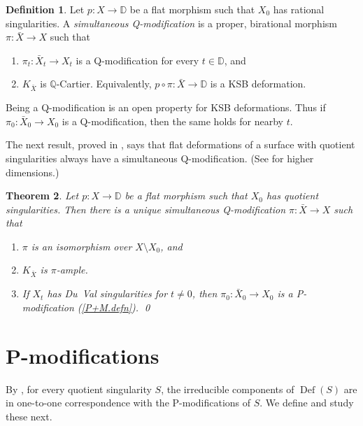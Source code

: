 \documentclass{amsart}
\newtheorem{thm}{Theorem}%
\theoremstyle{definition}
\newtheorem{defn}[thm]{Definition}
\theoremstyle{remark}
\newcommand{\dd}[0]{{\mathbb D}}
\newcommand{\q}[0]{{\mathbb Q}}
\newcommand{\defsp}[0]{\operatorname{Def}}
\begin{document}
\medskip






\begin{defn} \label{sim.Q.mod.defn} Let $p:X\to \dd$ be a flat morphism such that $X_0$ has rational singularities. A {\it simultaneous Q-modification} is a
  proper, birational morphism  $\pi:\bar X\to X$ such that
\begin{enumerate}
       \item $\pi_t:\bar X_t\to X_t$ is a Q-modification for every $t\in \dd$, and
    \item $K_{\bar X}$ is $\q$-Cartier. Equivalently,     $p\circ \pi:\bar X\to \dd$ is a KSB deformation.
\end{enumerate}
Being a Q-modification is an open property for KSB deformations.
Thus if  $\pi_0:\bar X_0\to X_0$ is a Q-modification, then the same holds for nearby $t$.
\end{defn}


The next result, proved in \cite[3.5]{ksb},  says that flat deformations of a surface  with quotient singularities always have a simultaneous Q-modification.
(See  \cite[5.41]{k-modbook} for higher dimensions.)

\begin{thm}\label{cmod.ksb.thm}
Let $p:X\to \dd$ be a flat morphism such that $X_0$ has quotient singularities. Then there is a unique  simultaneous Q-modification $\pi:\bar X\to X$ such that
  \begin{enumerate}
  \item $\pi$ is an isomorphism over $X\setminus X_0$, and 
        \item $K_{\bar X}$ is  $\pi$-ample.
    \item If $X_t$ has Du~Val singularities for $t\neq 0$, then
 $\pi_0:\bar X_0\to X_0$ is a P-modification  (\ref{P+M.defn}).
      \qed
  \end{enumerate}
\end{thm}






\section{P-modifications}

By \cite[3.9]{ksb}, for every quotient singularity $S$, the irreducible components of $\defsp(S)$ are in one-to-one correspondence with the 
P-modifications of $S$. We define and study these next.
\end{document}
